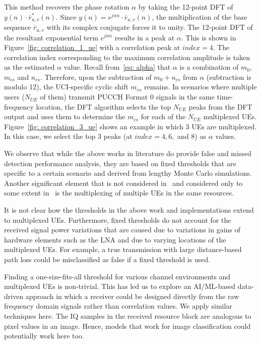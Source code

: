 \documentclass[journal]{IEEEtran}
\begin{document}
This method recovers the phase rotation $\alpha$ by taking the 12-point DFT of $y(n)\cdot \bar{r}^{*}_{u,v} (n)$. Since $y(n)=e^{j \alpha n}\cdot \bar{r}_{u,v}(n)$, the multiplication of the base sequence $\bar{r}_{u,v}$ with its complex conjugate forces it to unity. The 12-point DFT of the resultant exponential term $e^{j \alpha n}$ results in a peak at $\alpha$. This is shown in Figure~\ref{fig: correlation_1_ue} with a correlation peak at $index = 4$. The correlation index corresponding to the maximum correlation amplitude is taken as the estimated $\alpha$ value. Recall from~\eqref{eq: alpha} that $\alpha$ is a combination of $m_{0}$, $m_{cs}$ and $n_{cs}$. Therefore, upon the subtraction of $m_{0} + n_{cs}$ from $\alpha$ (subtraction is modulo 12), the UCI-specific cyclic shift $m_{cs}$ remains. In scenarios where multiple users ($N_{UE}$ of them) transmit PUCCH Format 0 signals in the same time-frequency location, the DFT algorithm selects the top $N_{UE}$ peaks from the DFT output and uses them to determine the $m_{cs}$ for each of the $N_{UE}$ multiplexed UEs. Figure~\ref{fig: correlation_3_ue} shows an example in which 3 UEs are multiplexed. In this case, we select the top 3 peaks (at $index = 4, 6,$ and $8$) as $\alpha$ values. 

We observe that while the above works in literature do provide false and missed detection performance analysis, they are based on fixed thresholds that are specific to a certain scenario and derived from lengthy Monte Carlo simulations. Another significant element that is not considered in~\cite{kim2020performance, tadavarty2021performance, phan2021enhanced} and considered only to some extent in~\cite{5gtbiitm} is the multiplexing of multiple UEs in the same resources. 

It is not clear how the thresholds in the above work and implementations extend to multiplexed UEs. Furthermore, fixed thresholds do not account for the received signal power variations that are caused due to variations in gains of hardware elements such as the LNA and due to varying locations of the multiplexed UEs. For example, a true transmission with large distance-based path loss could be misclassified as false if a fixed threshold is used.

Finding a one-size-fits-all threshold for various channel environments and multiplexed UEs is non-trivial. This has led us to explore an AI/ML-based data-driven approach in which a receiver could be designed directly from the raw frequency domain signals rather than correlation values. We apply similar techniques here. The IQ samples in the received resource block are analogous to pixel values in an image. Hence, models that work for image classification could potentially work here too.
\end{document}
